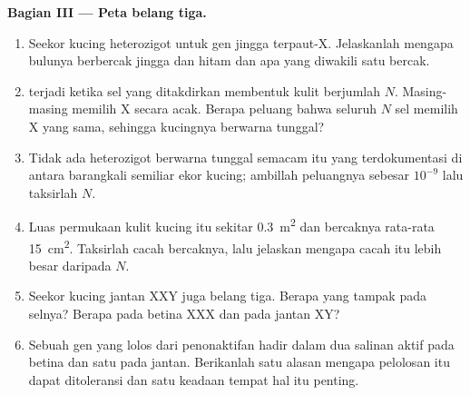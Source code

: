 \begin{problem}
\medskip
\noindent\textbf{Bagian III --- Peta belang tiga.}
\begin{enumerate}[resume]
  \item Seekor kucing heterozigot untuk gen jingga terpaut-X. Jelaskanlah
        mengapa bulunya berbercak jingga dan hitam dan apa yang diwakili
        satu bercak.
  \item {} terjadi ketika sel yang ditakdirkan membentuk kulit
        berjumlah $N$. Masing-masing memilih X secara acak. Berapa peluang
        bahwa seluruh $N$ sel memilih X yang sama, sehingga kucingnya
        berwarna tunggal?
  \item Tidak ada heterozigot berwarna tunggal semacam itu yang
        terdokumentasi di antara barangkali semiliar ekor kucing; ambillah
        peluangnya sebesar $10^{-9}$ lalu taksirlah $N$.
  \item Luas permukaan kulit kucing itu sekitar \qty{0.3}{m^2} dan
        bercaknya rata-rata \qty{15}{cm^2}. Taksirlah cacah bercaknya, lalu
        jelaskan mengapa cacah itu lebih besar daripada $N$.
  \item Seekor kucing jantan XXY juga belang tiga. Berapa  yang
        tampak pada selnya? Berapa pada betina XXX dan pada jantan XY?
  \item Sebuah gen yang lolos dari penonaktifan hadir dalam dua salinan
        aktif pada betina dan satu pada jantan. Berikanlah satu alasan
        mengapa pelolosan itu dapat ditoleransi dan satu keadaan tempat hal
        itu penting.
\end{enumerate}


\end{problem}
